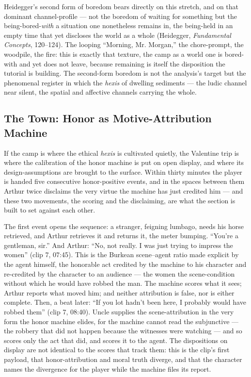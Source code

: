 Heidegger's second form of boredom bears directly on this stretch, and on that dominant channel-profile — not the boredom of waiting for something but the being-bored-\textit{with} a situation one nonetheless remains in, the being-held in an empty time that yet discloses the world as a whole (Heidegger, \textit{Fundamental Concepts}, 120–124). The looping ``Morning, Mr. Morgan,'' the chore-prompt, the woodpile, the fire: this is exactly that texture, the camp as a world one is bored-with and yet does not leave, because remaining is itself the disposition the tutorial is building. The second-form boredom is not the analysis's target but the phenomenal register in which the \textit{hexis} of dwelling sediments — the ludic channel near silent, the spatial and affective channels carrying the whole.

\bigskip

\subsection*{The Town: Honor as Motive-Attribution Machine}

If the camp is where the ethical \textit{hexis} is cultivated quietly, the Valentine trip is where the calibration of the honor machine is put on open display, and where its design-assumptions are brought to the surface. Within thirty minutes the player is handed five consecutive honor-positive events, and in the spaces between them Arthur twice disclaims the very virtue the machine has just credited him — and these two movements, the scoring and the disclaiming, are what the section is built to set against each other.

The first event opens the sequence: a stranger, feigning lumbago, needs his horse retrieved, and Arthur retrieves it and returns it, the meter bumping. ``You're a gentleman, sir.'' And Arthur: ``No, not really. I was just trying to impress the women'' (clip 7, 07:45). This is the Burkean scene–agent ratio made explicit by the agent himself, the honorable act credited by the machine to his character and re-credited by the character to an audience — the women the scene-condition without which he would have robbed the man. The machine scores what it sees; Arthur reports what moved him; and neither attribution is false, nor is either complete. Then, a beat later: ``If you lot hadn't been here, I probably would have robbed them'' (clip 7, 08:40). Uncle supplies the scene-attribution in the very form the honor machine elides, for the machine cannot read the subjunctive — the robbery that did not happen because the witnesses were watching — and so scores only the act that did, and scores it to the agent. The dispositions on display are not identical to the scores that track them: this is the clip's first payload, that honor-attribution and moral truth diverge, and that the character names the divergence for the player while the machine files its report.

